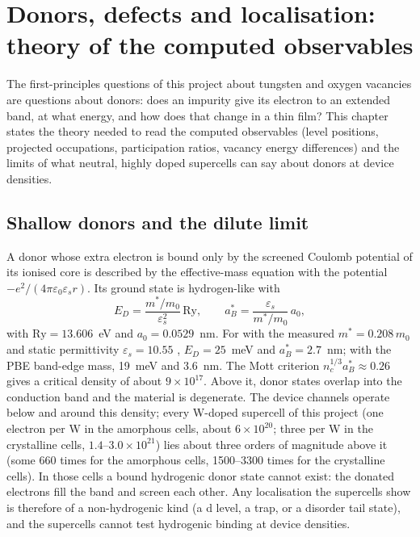 \chapter{Donors, defects and localisation: theory of the computed observables}
\label{ch:mono-defect-theory}

The first-principles questions of this project about tungsten and oxygen vacancies are questions about donors: does an
impurity give its electron to an extended band, at what energy, and how does that change in a thin film? This chapter
states the theory needed to read the computed observables (level positions, projected occupations, participation
ratios, vacancy energy differences) and the limits of what neutral, highly doped supercells can say about donors at
device densities.

\section{Shallow donors and the dilute limit}
\label{sec:mono-defect-hydrogenic}

A donor whose extra electron is bound only by the screened Coulomb potential of its ionised core is described by the
effective-mass equation with the potential $-e^2/(4\pi\varepsilon_0\varepsilon_s r)$. Its ground state is hydrogen-like
with
\begin{equation}
E_D = \frac{m^*/m_0}{\varepsilon_s^2}\,\mathrm{Ry}, \qquad a_B^* = \frac{\varepsilon_s}{m^*/m_0}\,a_0 ,
\label{eq:mono-defect-hyd}
\end{equation}
with $\mathrm{Ry} = 13.606$~eV and $a_0 = 0.0529$~nm. For \InO{} with the measured $m^* = 0.208\,m_0$ and static
permittivity $\varepsilon_s = 10.55$ \citep[p.~225102-1]{Stokey2021}, $E_D = 25$~meV and $a_B^* = 2.7$~nm; with the PBE
band-edge mass, 19~meV and 3.6~nm. The Mott criterion $n_c^{1/3}a_B^* \approx 0.26$ gives a critical density of about
$9\times10^{17}$\cmcu{}. Above it, donor states overlap into the conduction band and the material is degenerate. The
device channels operate below and around this density; every W-doped supercell of this project (one electron per W in
the amorphous cells, about $6\times10^{20}$\cmcu{}; three per W in the crystalline cells, $1.4$--$3.0\times10^{21}$\cmcu{})
lies about three orders of magnitude above it (some 660 times for the amorphous cells, 1500--3300 times for the
crystalline cells). In those cells a bound hydrogenic donor state cannot exist: the donated
electrons fill the band and screen each other. Any localisation the supercells show is therefore of a non-hydrogenic
kind (a d level, a trap, or a disorder tail state), and the supercells cannot test hydrogenic binding at device
densities.

